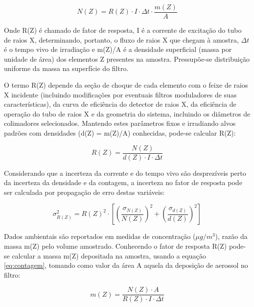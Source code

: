 \begin{equation}
  \label{eq:contagem}
  N(Z) = R(Z) \cdot I \cdot \Delta t  \cdot \frac{m(Z)}{A}
\end{equation}

Onde R(Z) é chamado de fator de resposta, I é a corrente de excitação do tubo 
de raios X, determinando, portanto, o fluxo de raios X que chegam à amostra, 
$\Delta t$ é o tempo vivo de irradiação e m(Z)/A é a densidade superficial
(massa por unidade de área) dos elementos Z presentes na amostra. 
Pressupõe-se distribuição uniforme da massa na superfície do filtro.

O termo R(Z) depende da seção de choque de cada elemento com o feixe de 
raios X incidente (incluindo modificações por eventuais filtros moduladores 
de suas características), da curva de eficiência do detector de raios X, 
da eficiência de operação do tubo de raios X e da geometria do sistema, 
incluindo os diâmetros de colimadores selecionados. Mantendo estes parâmetros 
fixos e irradiando alvos padrões com densidades (d(Z) = m(Z)/A) 
conhecidas, pode-se calcular R(Z):

\begin{equation}
  \label{eq:fator_de_resposta}
  R(Z) = \frac{N(Z)}{d(Z) \cdot I \cdot \Delta t}
\end{equation}

Considerando que a incerteza da corrente e do tempo vivo são desprezíveis 
perto da incerteza da densidade e da contagem, a incerteza no fator de resposta
pode ser calculada por propagação de erro destas variáveis:

\begin{equation}
  \label{eq:erro_fator_de_resposta}
  \sigma_{R(Z)}^2 = {R(Z)}^2 \cdot \left[ \left(\frac{\sigma_{N(Z)}}{N(Z)}\right)^2 + 
                                      \left(\frac{\sigma_{d(Z)}}{d(Z)}\right)^2 
                                   \right]
\end{equation}

Dados ambientais são reportados em medidas de concentração ($\mu g/m^3$),
razão da massa m(Z) pelo volume amostrado. Conhecendo o fator de resposta 
R(Z) pode-se calcular a massa m(Z) depositada na amostra, usando a equação 
\ref{eq:contagem}, tomando como valor da área A aquela da deposição de aerossol
no filtro:

\begin{equation}
  \label{eq:xrfedmassa}
  m(Z) = \frac{N(Z) \cdot A}{ R(Z) \cdot I \cdot \Delta t}
\end{equation}

